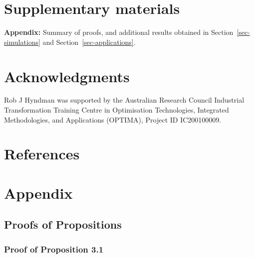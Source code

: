 \documentclass[
  11pt]{article}
\theoremstyle{plain}
\theoremstyle{remark}
\begin{document}
\section*{Supplementary materials}\label{supplementary-materials}

\textbf{Appendix:} Summary of proofs, and additional results obtained in
Section~\ref{sec-simulations} and Section~\ref{sec-applications}.

\section*{Acknowledgments}\label{acknowledgments}

Rob J Hyndman was supported by the Australian Research Council
Industrial Transformation Training Centre in Optimisation Technologies,
Integrated Methodologies, and Applications (OPTIMA), Project ID
IC200100009.

\section*{References}\label{references}

\renewcommand{\bibsection}{}


\newpage
\appendix
{}%
\setcounter{section}{0}
\renewcommand{\thesubsection}{\Alph{subsection}}
\renewcommand{\thetable}{\Alph{subsection}.\arabic{table}}
\renewcommand{\thefigure}{\Alph{subsection}.\arabic{figure}}
\setcounter{figure}{0}
\setcounter{table}{0}

\section*{Appendix}\label{appendix}

\subsection{Proofs of Propositions}\label{proofs-of-propositions}

\subsubsection{Proof of Proposition 3.1}\label{appendix-proofs}
\end{document}
